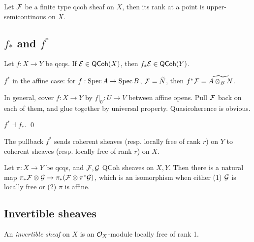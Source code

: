 \documentclass[11pt]{amsart}
\begin{document}
\begin{prop}
Let $\mathcal{F}$ be a finite type qcoh sheaf on $X$, then its rank at a point is upper-semicontinous on $X$.
\end{prop}

\subsection{$f_\ast$ and $f^\ast$}

\begin{prop}
    Let $f:X\to Y$ be qcqs. If $\mathcal{E}\in \mathsf{QCoh}(X)$, then $f_\ast \mathcal{E}\in \mathsf{QCoh}(Y)$.
\end{prop}

\begin{defn}
    $f^\ast$ in the affine case: for $f:\operatorname{Spec} A\to \operatorname{Spec} B$, $\mathcal{F} = \widetilde{N}$, then $f^\ast \mathcal{F} = \widetilde{A\otimes_B N}$.

    In general, cover $f:X\to Y$ by $f|_U:U\to V$ between affine opens. Pull $\mathcal{F}$ back on each of them, and glue together by universal property. Quasicoherence is obvious.
\end{defn}

\begin{prop}
    $f^\ast \dashv f_\ast$. \qed
\end{prop}

\begin{prop}
    The pullback $f^\ast$ sends coherent sheaves (resp. locally free of rank $r$) on $Y$ to coherent sheaves (resp. locally free of rank $r$) on $X$.
\end{prop}

\begin{prop}
    
\end{prop}

\begin{prop}
    Let $\pi:X\to Y$ be qcqs, and $\mathcal{F}, \mathcal{G}$ QCoh sheaves on $X,Y$. Then there is a natural map $\pi_\ast \mathcal{F}\otimes \mathcal{G} \to \pi_\ast(\mathcal{F}\otimes \pi^{\ast}\mathcal{G})$, which is an isomorphism when either (1) $\mathcal{G}$ is locally free or (2) $\pi$ is affine.
\end{prop}


\subsection{Invertible sheaves}

\begin{defn}
    An \emph{invertible sheaf} on $X$ is an $\mathcal{O}_X$-module locally free of rank 1.
\end{defn}
\end{document}
